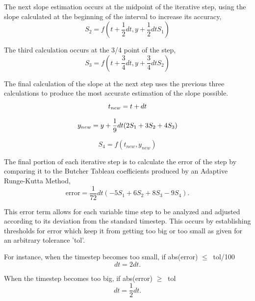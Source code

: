 \documentclass[letterpaper, twoside]{article}
\numberwithin{equation}{section}
\begin{document}
The next slope estimation occurs at the midpoint of the iterative step, using the slope calculated at the beginning of the interval to increase its accuracy,
\begin{equation} \label{eq: S_2}
  S_2 = f(t + \frac{1}{2} dt,y + \frac{1}{2} dt S_1)
\end{equation}

The third calculation occurs at the 3/4  point of the step,
\begin{equation} \label{eq: S_3}
  S_3 = f(t + \frac{3}{4} dt,y+\frac{3}{4} dt S_2)
\end{equation}

The final calculation of the slope at the next step uses the previous three calculations to produce the most accurate estimation of the slope possible. 
\begin{equation} \label{eq: t_{new}}
  t_{new} = t + dt
\end{equation}

\begin{equation} \label{eq: y_{new}}
  y_{new} = y + \frac{1}{9} dt (2 S_1 + 3 S_2 + 4 S_3)
\end{equation}

\begin{equation} \label{eq: S_4}
  S_4 = f(t_{new},y_{new})
\end{equation}

The final portion of each iterative step is to calculate the error of the step by comparing it to the Butcher Tableau coefficients produced by an Adaptive Runge-Kutta Method,
\begin{equation} \label{eq: errorfunction}
  \mathrm{error} = \frac{1}{72} dt (-5 S_1 + 6 S_2 + 8 S_3 - 9 S_4).
\end{equation}

This error term allows for each variable time step to be analyzed and adjusted according to its deviation from the standard timestep. This occurs by establishing thresholds for error which keep it from getting too big or too small as given for an arbitrary tolerance 'tol'.

For instance, when the timestep becomes too small,  if abs(error) $ \leq\ $ tol/100
\begin{equation}
  dt = 2 dt.
\end{equation}

When the timestep becomes too big, if abs(error) $ \geq\ $ tol
\begin{equation}
  dt = \frac{1}{2} dt.
\end{equation}
\end{document}
